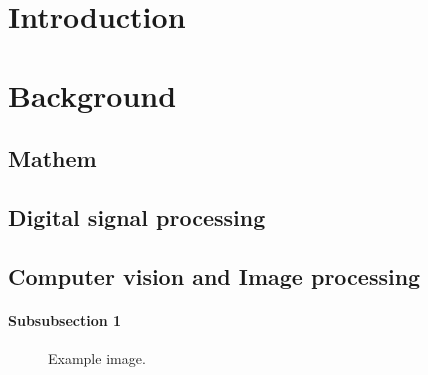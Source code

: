 \documentclass[12pt]{report} %
\begin{document}

\tableofcontents %

\newpage %


\chapter{Introduction} %

\chapter{Background}

\section{Mathem}

\section{Digital signal processing}

\section{Computer vision and Image processing}

\subsubsection{Subsubsection 1} %

\lipsum[3] %

\begin{figure}[H] %
\caption{Example image.}
\label{fig:speciation}
\end{figure}
\end{document}
